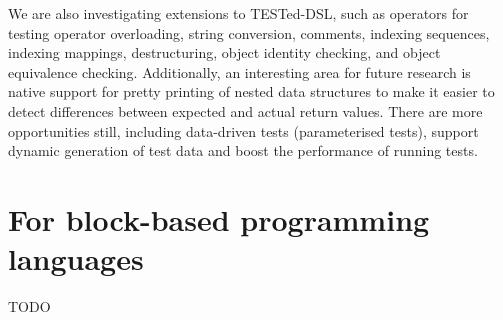 \documentclass[main]{subfiles}
\begin{document}
We are also investigating extensions to TESTed-DSL, such as operators for testing operator overloading, string conversion, comments, indexing sequences, indexing mappings, destructuring, object identity checking, and object equivalence checking.
Additionally, an interesting area for future research is native support for pretty printing of nested data structures to make it easier to detect differences between expected and actual return values.
There are more opportunities still, including data-driven tests (parameterised tests), support dynamic generation of test data and boost the performance of running tests.

\section{For block-based programming languages}\label{sec:for-block-based-programming-languages}

TODO
\end{document}
